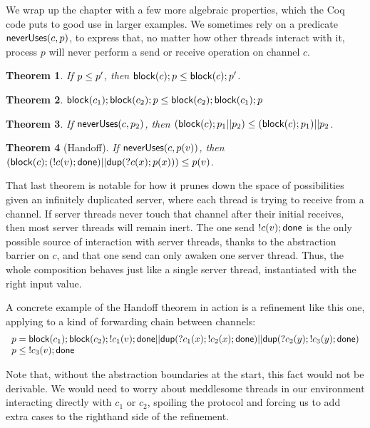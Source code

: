 \documentclass{amsbook}
\newtheorem{theorem}{Theorem}[chapter]
\theoremstyle{definition}
\theoremstyle{remark}
\numberwithin{section}{chapter}
\numberwithin{equation}{chapter}
\begin{document}
\newcommand{\neverUses}[2]{\mt{neverUses}(#1, #2)}

We wrap up the chapter with a few more algebraic properties, which the Coq code puts to good use in larger examples.
We sometimes rely on a predicate $\neverUses{c}{p}$, to express that, no matter how other threads interact with it, process $p$ will never perform a send or receive operation on channel $c$.

\begin{theorem}
  If $p \leq p'$, then $\mathsf{block}(c); p \leq \mathsf{block}(c); p'$.
\end{theorem}

\begin{theorem}
  $\mathsf{block}(c_1); \mathsf{block}(c_2); p \leq \mathsf{block}(c_2); \mathsf{block}(c_1); p$
\end{theorem}

\begin{theorem}
  If $\neverUses{c}{p_2}$, then $(\mathsf{block}(c); p_1 || p_2) \leq (\mathsf{block}(c); p_1) || p_2$.
\end{theorem}

\begin{theorem}[Handoff]
  If $\neverUses{c}{p(v)}$, then $(\mathsf{block}(c); (!c(v); \mathsf{done}) || \mathsf{dup}(?c(x); p(x))) \leq p(v)$.
\end{theorem}

That last theorem is notable for how it prunes down the space of possibilities given an infinitely duplicated server, where each thread is trying to receive from a channel.
If server threads never touch that channel after their initial receives, then most server threads will remain inert.
The one send $!c(v); \mathsf{done}$ is the only possible source of interaction with server threads, thanks to the abstraction barrier on $c$, and that one send can only awaken one server thread.
Thus, the whole composition behaves just like a single server thread, instantiated with the right input value.

A concrete example of the Handoff theorem in action is a refinement like this one, applying to a kind of forwarding chain between channels:
$$\begin{array}{l}
  p = \mathsf{block}(c_1); \mathsf{block}(c_2); !c_1(v); \mathsf{done} || \mathsf{dup}(?c_1(x); !c_2(x); \mathsf{done}) || \mathsf{dup}(?c_2(y); !c_3(y); \mathsf{done}) \\
  p \leq \; !c_3(v); \mathsf{done}
\end{array}$$

Note that, without the abstraction boundaries at the start, this fact would not be derivable.
We would need to worry about meddlesome threads in our environment interacting directly with $c_1$ or $c_2$, spoiling the protocol and forcing us to add extra cases to the righthand side of the refinement.
\end{document}
